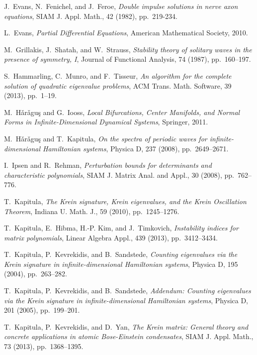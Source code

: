 \documentclass[review,onefignum,onetabnum]{siamart171218}
\begin{document}
\begin{thebibliography}{10}
{\sc J.~Evans, N.~Fenichel, and J.~Feroe}, {\em Double impulse solutions in nerve axon equations}, {SIAM} J. Appl. Math., 42 (1982), pp.~219-234.

{\sc L.~Evans}, {\em Partial Differential Equations}, American Mathematical Society, 2010.

{\sc M.~Grillakis, J.~Shatah, and W.~Strauss}, {\em Stability theory of
  solitary waves in the presence of symmetry, {I}}, Journal of Functional
  Analysis, 74 (1987), pp.~160--197.

{\sc S.~Hammarling, C.~Munro, and F.~Tisseur}, {\em An algorithm for the
  complete solution of quadratic eigenvalue problems}, {ACM} Trans. Math.
  Software, 39 (2013), pp.~1--19.

{\sc M.~H\v{a}r\v{a}gu\c{s} and G.~Iooss}, {\em Local Bifurcations, Center
  Manifolds, and Normal Forms in Infinite-Dimensional Dynamical Systems},
  Springer, 2011.

{\sc M.~H\v{a}r\v{a}gu\c{s} and T.~Kapitula}, {\em On the spectra of periodic
  waves for infinite-dimensional {H}amiltonian systems}, Physica D, 237 (2008),
  pp.~2649--2671.

{\sc I.~Ipsen and R.~Rehman}, {\em Perturbation bounds for determinants and
  characteristic polynomials}, {SIAM} J. Matrix Anal. and Appl., 30 (2008),
  pp.~762--776.

{\sc T.~Kapitula}, {\em The {K}rein signature, {K}rein eigenvalues, and the
  {Krein Oscillation Theorem}}, Indiana U. Math. J., 59 (2010), pp.~1245--1276.

{\sc T.~Kapitula, E.~Hibma, H.-P. Kim, and J.~Timkovich}, {\em Instability
  indices for matrix polynomials}, Linear Algebra Appl., 439 (2013),
  pp.~3412--3434.

{\sc T.~Kapitula, P.~Kevrekidis, and B.~Sandstede}, {\em Counting eigenvalues
  via the {K}rein signature in infinite-dimensional {H}amiltonian systems},
  Physica D, 195 (2004), pp.~263--282.

{\sc T.~Kapitula, P.~Kevrekidis, and B.~Sandstede}, {\em Addendum: {C}ounting
  eigenvalues via the {K}rein signature in infinite-dimensional {H}amiltonian
  systems}, Physica D, 201 (2005), pp.~199--201.

{\sc T.~Kapitula, P.~Kevrekidis, and D.~Yan}, {\em The {K}rein matrix:
  {G}eneral theory and concrete applications in atomic {B}ose-{E}instein
  condensates}, SIAM J. Appl. Math., 73 (2013), pp.~1368--1395.


\end{thebibliography}
\end{document}
